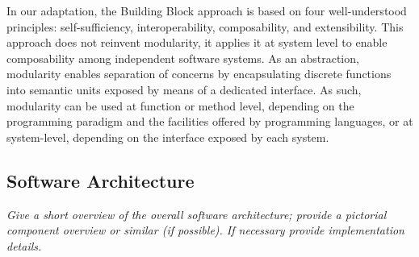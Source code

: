 \documentclass[preprint,12pt, a4paper]{elsarticle}
\begin{document}
In our adaptation, the Building Block approach is based on four
well-understood principles: self-sufficiency, interoperability,
composability, and extensibility. 
%
%
This approach does not reinvent modularity, it applies it at system level to
enable composability among independent software systems. As an abstraction,
modularity enables separation of concerns by encapsulating discrete functions
into semantic units exposed by means of a dedicated interface. As such,
modularity can be used at function or method level, depending on the
programming paradigm and the facilities offered by programming languages, or
at system-level, depending on the interface exposed by each system.

\subsection{Software Architecture}\label{ssec:architecture}

{\em Give a short overview of the overall software architecture; provide a
pictorial component overview or similar (if possible). If necessary provide
implementation details.}


\end{document}
